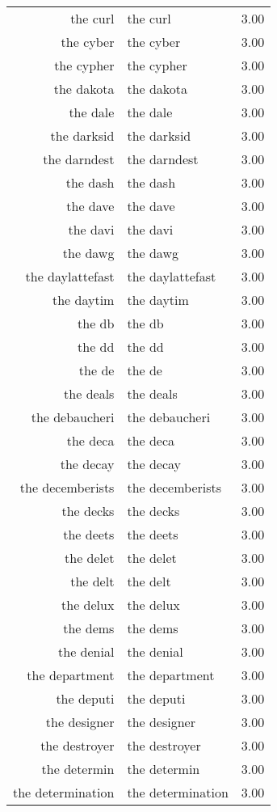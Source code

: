 \begin{table}[ht]
\begin{tabular}{rlr}
  the curl & the curl & 3.00 \\ 
  the cyber & the cyber & 3.00 \\ 
  the cypher & the cypher & 3.00 \\ 
  the dakota & the dakota & 3.00 \\ 
  the dale & the dale & 3.00 \\ 
  the darksid & the darksid & 3.00 \\ 
  the darndest & the darndest & 3.00 \\ 
  the dash & the dash & 3.00 \\ 
  the dave & the dave & 3.00 \\ 
  the davi & the davi & 3.00 \\ 
  the dawg & the dawg & 3.00 \\ 
  the daylattefast & the daylattefast & 3.00 \\ 
  the daytim & the daytim & 3.00 \\ 
  the db & the db & 3.00 \\ 
  the dd & the dd & 3.00 \\ 
  the de & the de & 3.00 \\ 
  the deals & the deals & 3.00 \\ 
  the debaucheri & the debaucheri & 3.00 \\ 
  the deca & the deca & 3.00 \\ 
  the decay & the decay & 3.00 \\ 
  the decemberists & the decemberists & 3.00 \\ 
  the decks & the decks & 3.00 \\ 
  the deets & the deets & 3.00 \\ 
  the delet & the delet & 3.00 \\ 
  the delt & the delt & 3.00 \\ 
  the delux & the delux & 3.00 \\ 
  the dems & the dems & 3.00 \\ 
  the denial & the denial & 3.00 \\ 
  the department & the department & 3.00 \\ 
  the deputi & the deputi & 3.00 \\ 
  the designer & the designer & 3.00 \\ 
  the destroyer & the destroyer & 3.00 \\ 
  the determin & the determin & 3.00 \\ 
  the determination & the determination & 3.00 \\ 

\end{tabular}
\end{table}
